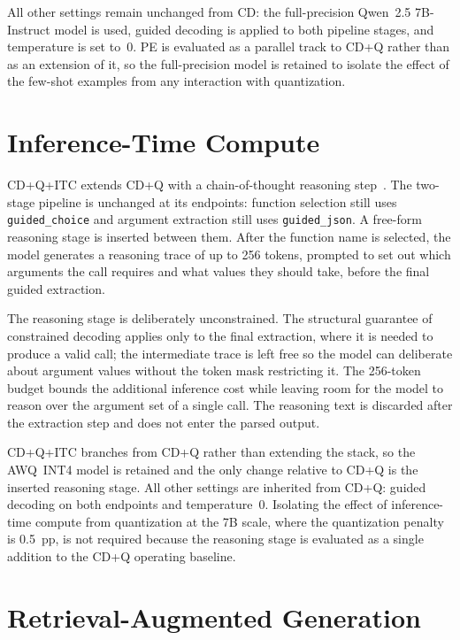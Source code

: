 All other settings remain unchanged from CD: the full-precision
Qwen~2.5 7B-Instruct model is used, guided decoding is applied to
both pipeline stages, and temperature is set to~0. PE is evaluated
as a parallel track to CD+Q rather than as an extension of it, so the
full-precision model is retained to isolate the effect of the few-shot
examples from any interaction with quantization.

\section{Inference-Time Compute}
\label{sec:method-itc}

CD+Q+ITC extends CD+Q with a chain-of-thought reasoning
step~\cite{wei2022chain,snell2024scaling}. The two-stage pipeline is
unchanged at its endpoints: function selection still uses
\texttt{guided\_choice} and argument extraction still uses
\texttt{guided\_json}. A free-form reasoning stage is inserted between
them. After the function name is selected, the model generates a reasoning
trace of up to 256 tokens, prompted to set out which arguments the call
requires and what values they should take, before the final guided
extraction.

The reasoning stage is deliberately unconstrained. The structural guarantee
of constrained decoding applies only to the final extraction, where it is
needed to produce a valid call; the intermediate trace is left free so the
model can deliberate about argument values without the token mask
restricting it. The 256-token budget bounds the additional inference cost
while leaving room for the model to reason over the argument set of a
single call. The reasoning text is discarded after the extraction step and
does not enter the parsed output.

CD+Q+ITC branches from CD+Q rather than extending the stack, so the
AWQ~INT4 model is retained and the only change relative to CD+Q is the
inserted reasoning stage. All other settings are inherited from CD+Q:
guided decoding on both endpoints and temperature~0. Isolating the effect
of inference-time compute from quantization at the 7B scale, where the
quantization penalty is 0.5~pp, is not required because the reasoning stage
is evaluated as a single addition to the CD+Q operating baseline.

\section{Retrieval-Augmented Generation}

